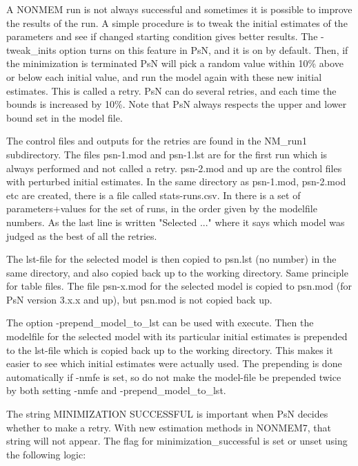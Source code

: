 A NONMEM run is not always successful and sometimes it is possible to improve the results of the run. A simple procedure is to tweak the initial estimates of the parameters and see if changed starting condition gives better results. The -tweak\_inits option turns on this feature in PsN, and it is on by default. Then, if the minimization is terminated PsN will pick a random value within 10\% above or below each initial value, and run the model again with these new initial estimates. This is called a retry. PsN can do several retries, and each time the bounds is increased by 10\%. Note that PsN always respects the upper and lower bound set in the model file. 

The control files and outputs for the retries are found in the NM\_run1 subdirectory. The files psn-1.mod and psn-1.lst are for the first run which is always performed and not called a retry. psn-2.mod and up are the control files with perturbed initial estimates. In the same directory as psn-1.mod, psn-2.mod etc are created, there is a file called stats-runs.csv. In there is a set of parameters+values for the set of runs, in the order given by the modelfile numbers. As the last line is written "Selected ..." where it says which model was judged as the best of all the retries.

The lst-file for the selected model is then copied to psn.lst (no number) in the same directory, and also copied back up to the working directory. Same principle for table files. The file psn-x.mod for the selected model is copied to psn.mod (for PsN version 3.x.x and up), but psn.mod is not copied back up.   	

The option -prepend\_model\_to\_lst can be used with execute. Then the modelfile for the selected model with its particular initial estimates is prepended to the lst-file which is copied back up to the working directory. This makes it easier to see which initial estimates were actually used. The prepending is done automatically if -nmfe is set, so do not make the model-file be prepended twice by both setting -nmfe and -prepend\_model\_to\_lst.

The string MINIMIZATION SUCCESSFUL is important when PsN decides whether to make a retry. With new estimation methods in NONMEM7, that string will not appear. The flag for minimization\_successful is set or unset using the following logic:

